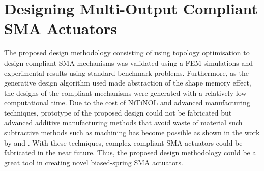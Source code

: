 \section{Designing Multi-Output Compliant SMA Actuators}
The proposed design methodology consisting of using topology optimisation to design compliant SMA mechanisms was validated using a FEM simulations and experimental results using standard benchmark problems. Furthermore, as the generative design algorithm used made abstraction of the shape memory effect, the designs of the compliant mechanisms were generated with a relatively low computational time. Due to the cost of NiTiNOL and advanced manufacturing techniques, prototype of the proposed design could not be fabricated but advanced additive manufacturing methods that avoid waste of material such subtractive methods such as machining has become possible as shown in the work by \cite{alaghaAdditiveManufacturingShape2021} and \cite{zhuPredictiveAnalyticalModelling2021a}. With these techniques, complex compliant SMA actuators could be fabricated in the near future. Thus, the proposed design methodology could be a great tool in creating novel biased-spring SMA actuators.


